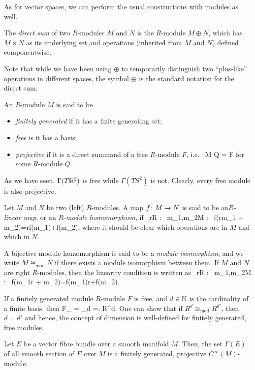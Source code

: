 As for vector spaces, we can perform the usual constructions with modules as well.

\bd
The \emph{direct sum} of two $R$-modules $M$ and $N$ is the $R$-module $M\oplus N$, which has $M\times N$ as its underlying set and operations (inherited from $M$ and $N$) defined componentwise. 
\ed

Note that while we have been using $\oplus$ to temporarily distinguish two ``plus-like'' operations in different spaces, the symbol $\oplus$ is the standard notation for the direct sum.

\bd
An $R$-module $M$ is said to be
\begin{itemize}
\item \emph{finitely generated} if it has a finite generating set;
\item \emph{free} is it has a basis;
\item \emph{projective} if it is a direct summand of a free $R$-module $F$, i.e.\
\bse
M \oplus Q = F
\ese
for some $R$-module $Q$.
\end{itemize}
\ed

\be
As we have seen, $\Gamma(T\mathbb{R}^2)$ is free while $\Gamma(TS^2)$ is not. 
\ee
\be
Clearly, every free module is also projective.
\ee

\bd
Let $M$ and $N$ be two (left) $R$-modules. A map $f\colon M \to N$ is said to be an\emph{$R$-linear map}, or an \emph{$R$-module homomorphism}, if
\bse
\forall \, r\in R : \forall \, m_1,m_2\in M : \ f(rm_1 + m_2)=rf(m_1)+f(m_2),
\ese
where it should be clear which operations are in $M$ and which in $N$.

A bijective module homomorphism is said to be a \emph{module isomorphism}, and we write $M\cong_{\mathrm{mod}}N$ if there exists a module isomorphism between them.
\ed
If $M$ and $N$ are right $R$-modules, then the linearity condition is written as
\bse
\forall \, r\in R : \forall \, m_1,m_2\in M : \ f(m_1r + m_2)=f(m_1)r+f(m_2).
\ese

\bp
If a finitely generated module $R$-module $F$ is free, and $d\in \mathbb{N}$ is the cardinality of a finite basis, then
\bse
F\cong_ = _{d } =: R^d.
\ese
\ep
One can show that if $R^d\cong_\mathrm{mod} R^{d'}$, then $d=d'$ and hence, the concept of dimension is well-defined for finitely generated, free modules.

\begin{theorem}
Let $E$ be a vector fibre bundle over a smooth manifold $M$. Then, the set $\Gamma(E)$ of all smooth section of $E$ over $M$ is a finitely generated, projective $C^\infty(M)$-module.
\end{theorem}

